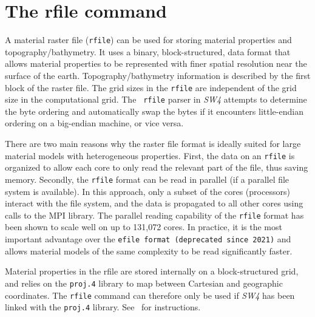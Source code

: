 \documentclass[11pt]{report}
\begin{document}
{%

\section{The rfile command} \label{sec:rfile-mat}

A material raster file ({\tt rfile}) can be used for storing material properties and
topography/bathymetry. It uses a binary, block-structured, data format that allows material
properties to be represented with finer spatial resolution near the surface of the
earth. Topography/bathymetry information is described by the first block of the raster file. The
grid sizes in the {\tt rfile} are independent of the grid size in the computational grid. The {\tt
		rfile} parser in \emph{SW4} attempts to determine the byte ordering and automatically swap the
bytes if it encounters little-endian ordering on a big-endian machine, or vice versa.

There are two main reasons why the raster file format is ideally suited for large material models
with heterogeneous properties. First, the data on an {\tt rfile} is organized to allow each core to
only read the relevant part of the file, thus saving memory. Secondly, the {\tt rfile} format can be
read in parallel (if a parallel file system is available). In this approach, only a subset of the
cores (processors) interact with the file system, and the data is propagated to all other cores
using calls to the MPI library. The parallel reading capability of the {\tt rfile}
format has been shown to scale well on up to 131,072 cores. In practice, it is the most important
advantage over the {\tt efile format (deprecated since 2021)} and allows material models of the same complexity to be read
significantly faster.

Material properties in the rfile are stored internally on a block-structured grid, and relies on the
\verb+proj.4+ library to map between Cartesian and geographic coordinates. The {\tt rfile} command
can therefore only be used if \emph{SW4} has been linked with the \verb+proj.4+
library. See~\cite{SW4-install} for instructions.

}
\end{document}

